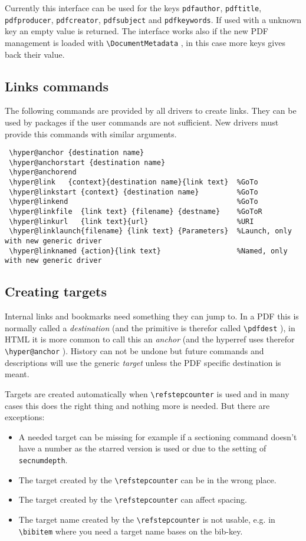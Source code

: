 \documentclass{article}
\newcommand*{\cs}[1]{%
  \texttt{\textbackslash #1}%
}
\newcommand*{\xpackage}[1]{\textsf{#1}}
\begin{document}
Currently this interface can be used for the keys \texttt{pdfauthor}, \texttt{pdftitle},
\texttt{pdfproducer},
\texttt{pdfcreator}, \texttt{pdfsubject} and \texttt{pdfkeywords}.
If used with a unknown key an empty value is returned.
The interface works also if the new PDF management is loaded with \cs{DocumentMetadata}, in this
case more keys gives back their value.


\subsection{Links commands}
The following commands are provided by all drivers to create links.
They can be used by packages if the user commands are not sufficient.
New drivers must provide this commands with similar arguments.

\begin{verbatim}
 \hyper@anchor {destination name}
 \hyper@anchorstart {destination name}
 \hyper@anchorend
 \hyper@link   {context}{destination name}{link text}  %GoTo
 \hyper@linkstart {context} {destination name}         %GoTo
 \hyper@linkend                                        %GoTo
 \hyper@linkfile  {link text} {filename} {destname}    %GoToR
 \hyper@linkurl   {link text}{url}                     %URI
 \hyper@linklaunch{filename} {link text} {Parameters}  %Launch, only with new generic driver
 \hyper@linknamed {action}{link text}                  %Named, only with new generic driver
\end{verbatim}

\subsection{Creating targets}

Internal links and bookmarks need something they can jump to. In a PDF this is normally called
a \emph{destination} (and the primitive is therefor called \cs{pdfdest}), in HTML it is more
common to call this an \emph{anchor} (and the \xpackage{hyperref} uses therefor \cs{hyper@anchor}).
History can not be undone but future commands and descriptions will use the generic
\emph{target} unless the PDF specific destination is meant.

Targets are created automatically when \cs{refstepcounter} is used and in many cases this
does the right thing and nothing more is needed.
But there are exceptions:
\begin{itemize}
\item A needed target can be missing for example
if a sectioning command doesn't have a number as the starred version is used or due to the
setting of \texttt{secnumdepth}.
\item The target created by the \cs{refstepcounter} can be in the wrong place.
\item The target created by the \cs{refstepcounter} can affect spacing.
\item The target name created by the \cs{refstepcounter} is not usable, e.g. in
\cs{bibitem} where you need a target name bases on the bib-key.
\end{itemize}
\end{document}
